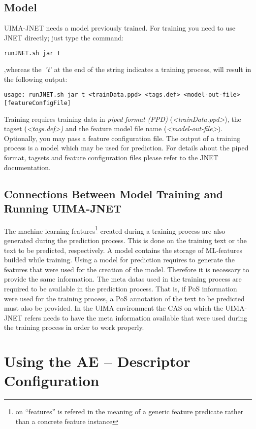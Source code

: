 \documentclass[11pt,a4paper,halfparskip]{scrartcl}
\begin{document}
\subsection{Model}
UIMA-JNET needs a model previously trained. For training you need to
use JNET directly; just type the command:
\begin{verbatim}
runJNET.sh jar t
\end{verbatim}
,whereas the \textit{´t'} at the end of the string indicates a training
process, will result in the following output:
\begin{verbatim}
usage: runJNET.sh jar t <trainData.ppd> <tags.def> <model-out-file>
[featureConfigFile]
\end{verbatim}
Training requires training data in \emph{piped format (PPD)}
(\textit{<trainData.ppd>}), the tagset (\emph{<tags.def>)} and the
feature model file name (\emph{<model-out-file>}).  Optionally, you
may pass a feature configuration file. The output of a training
process is a model which may be used for prediction.
For details about the piped format, tagsets and feature configuration files
please refer to the JNET documentation.

\subsection{Connections Between Model Training and Running UIMA-JNET}
The machine learning features\footnote{on ``features'' is refered in the
meaning of a generic feature predicate rather than a concrete feature instance}
created during a training process are also generated during the prediction
process. This is done on the training text or the text to be predicted,
respectively. A model contains the storage of ML-features builded while
training. Using a model for prediction requires to generate the features
that were used for the creation of the model. Therefore it is necessary to
provide the same information. The meta datas used in the
training process are required to be available in the prediction process. That
is, if PoS information were used for the training process, a PoS annotation of
the text to be predicted must also be provided. In the UIMA environment the CAS
on which the UIMA-JNET refers needs to have the meta information available that
were used during the training process in order to work properly.


\section{Using the AE -- Descriptor Configuration}
\end{document}
